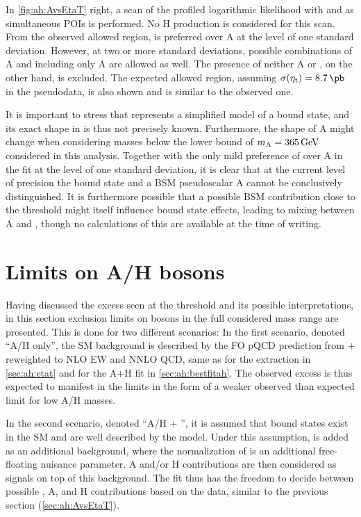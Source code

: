 In \cref{fig:ah:AvsEtaT} right, a scan of the profiled logarithmic likelihood with \gAtt and \sigetat as simultaneous POIs is performed. No H production is considered for this scan. From the observed allowed region, \etat is preferred over A at the level of one standard deviation. However, at two or more standard deviations, possible combinations of A and \etat including only A are allowed as well. The presence of neither A or \etat, on the other hand, is excluded. The expected allowed region, assuming $\sigetat = \SI{8.7}{\pb}$ in the pseudodata, is also shown and is similar to the observed one.

It is important to stress that \etat represents a simplified model of a \ttbar bound state, and its exact shape in \mtt is thus not precisely known. Furthermore, the \mtt shape of A might change when considering masses below the lower bound of $\mA = \SI{365}{\GeV}$ considered in this analysis. Together with the only mild preference of \etat over A in the fit at the level of one standard deviation, it is clear that at the current level of precision the \ttbar bound state \etat and a BSM pseudoscalar A cannot be conclusively distinguished. It is furthermore possible that a possible BSM contribution close to the \ttbar threshold might itself influence bound state effects, leading to mixing between A and \etat, though no calculations of this are available at the time of writing. 

\section{Limits on A/H bosons}
\label{sec:ah:limits}

Having discussed the excess seen at the \ttbar threshold and its possible interpretations, in this section exclusion limits on \AH bosons in the full considered mass range are presented. This is done for two different scenarios: In the first scenario, denoted ``A/H only'', the SM \ttbar background is described by the FO pQCD prediction from \powheg + \pythia reweighted to NLO EW and NNLO QCD, same as for the \etat extraction in \cref{sec:ah:etat} and for the A+H fit in \cref{sec:ah:bestfitah}. The observed excess is thus expected to manifest in the limits in the form of a weaker observed than expected limit for low A/H masses.

In the second scenario, denoted ``A/H + \etat'', it is assumed that \ttbar bound states exist in the SM and are well described by the \etat model. Under this assumption, \etat is added as an additional background, where the normalization of \etat is an additional free-floating nuisance parameter. A and/or H contributions are then considered as signals on top of this background. The fit thus has the freedom to decide between possible \etat, A, and H contributions based on the data, similar to the previous section (\cref{sec:ah:AvsEtaT}).


